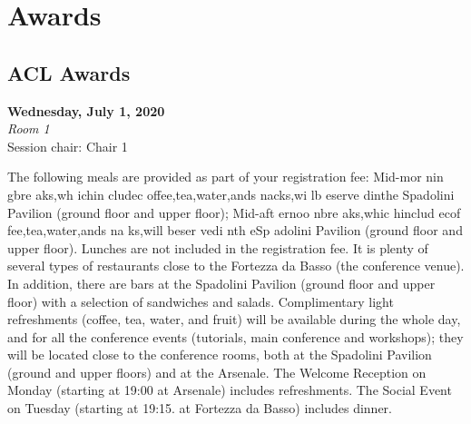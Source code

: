 \chapter{Awards}

\section{ACL Awards}
\vspace*{0.2cm}
\textbf{Wednesday, July 1, 2020}\\
\textit{Room 1}\\
{\Large{Session chair: Chair 1}}\\
\vspace*{0.2cm}

The following meals are provided as part of your registration fee:
Mid-mor nin gbre aks,wh ichin cludec offee,tea,water,ands nacks,wi lb eserve dinthe Spadolini Pavilion (ground floor and upper floor);
Mid-aft ernoo nbre aks,whic hinclud ecof fee,tea,water,ands na ks,will beser vedi nth eSp adolini Pavilion (ground floor and upper floor).
Lunches are not included in the registration fee. It is plenty of several types of restaurants close to the Fortezza da Basso (the conference venue). In addition, there are bars at the Spadolini Pavilion (ground floor and upper floor) with a selection of sandwiches and salads.
Complimentary light refreshments (coffee, tea, water, and fruit) will be available during the whole day, and for all the conference events (tutorials, main conference and workshops); they will be located close to the conference rooms, both at the Spadolini Pavilion (ground and upper floors) and at the Arsenale.
The Welcome Reception on Monday (starting at 19:00 at Arsenale) includes refreshments. The Social Event on Tuesday (starting at 19:15. at Fortezza da Basso) includes dinner.